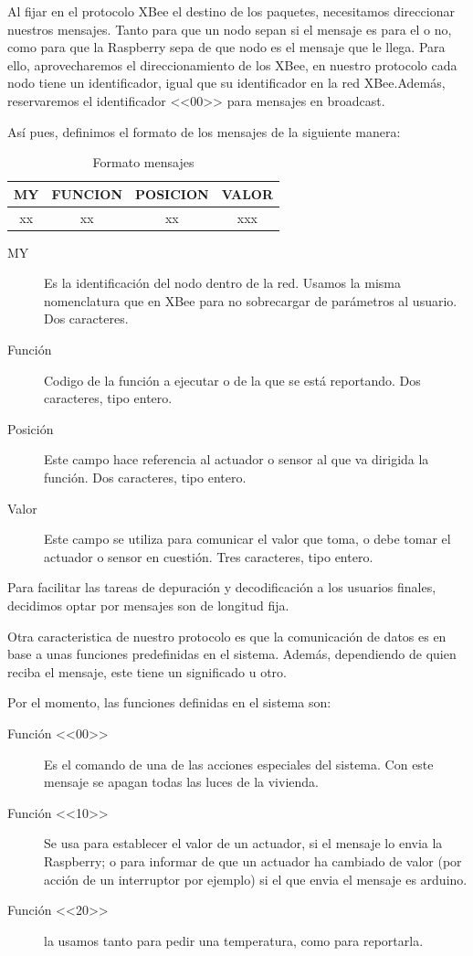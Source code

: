 Al fijar en el protocolo XBee el destino de los paquetes, necesitamos  direccionar nuestros mensajes. Tanto para que un nodo sepan si el mensaje es para el o no, como para que la Raspberry sepa de que nodo es el mensaje que le llega. Para ello, aprovecharemos el direccionamiento de los XBee, en nuestro protocolo cada nodo tiene un identificador, igual que su identificador en la red XBee.Además, reservaremos el identificador <<00>> para mensajes en broadcast.

Así pues, definimos el formato de los mensajes de la siguiente manera:

\begin{table}[h]
    \centering
    \begin{tabular}{cccc}
        \toprule
        MY & FUNCION & POSICION & VALOR \\ \toprule
        xx & xx      & xx       & xxx  \\ \bottomrule
    \end{tabular}
    \caption{Formato mensajes}
    \label{tab:formatoMensajes}
\end{table}


\begin{description}
    \item[MY] Es la identificación del nodo dentro de la red. Usamos la misma nomenclatura que en XBee para no sobrecargar de parámetros al usuario. Dos caracteres.
    \item[Función] Codigo de la función a ejecutar o de la que se está reportando. Dos caracteres, tipo entero.
    \item[Posición] Este campo hace referencia al actuador o sensor al que va dirigida la función. Dos caracteres, tipo entero.
    \item[Valor] Este campo se utiliza para comunicar el valor que toma, o debe tomar el actuador o sensor en cuestión. Tres caracteres, tipo entero.
\end{description}

Para facilitar las tareas de depuración y decodificación a los usuarios finales, decidimos optar por mensajes son de longitud fija.

Otra caracteristica de nuestro protocolo es que la  comunicación de datos es en base a unas funciones predefinidas en el sistema. Además, dependiendo de quien reciba el mensaje, este tiene un significado u otro.

Por el momento, las funciones definidas en el sistema son:

\begin{description}
    \item[Función <<00>>] Es el comando de una de las acciones especiales del sistema. Con este mensaje se apagan todas las luces de la vivienda.
    \item[Función <<10>>] Se usa para establecer el valor de un actuador, si el mensaje lo envia la Raspberry; o para informar de que un actuador ha cambiado de valor (por acción de un interruptor por ejemplo) si el que envia el mensaje es arduino.
    \item[Función <<20>>] la usamos tanto para pedir una temperatura, como para reportarla.
\end{description}

